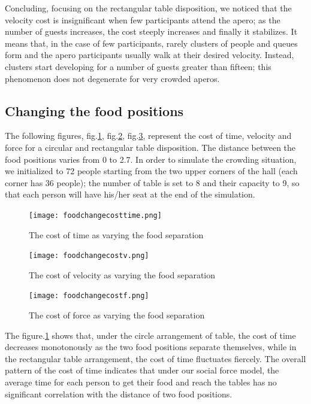 \documentclass[11pt]{article}
\begin{document}
Concluding, focusing on the rectangular table disposition, we noticed that the velocity cost is insignificant when few participants attend the apero; as the number of guests increases, the cost steeply increases and finally it stabilizes. It means that, in the case of few participants, rarely clusters of people and queues form and the apero participants usually walk at their desired velocity. Instead, clusters start developing for a number of guests greater than fifteen; this phenomenon does not degenerate for very crowded aperos.

\subsection{Changing the food positions}

The following figures, fig.\ref{fig:foodcostt}, fig.\ref{fig:foodcostv}, fig.\ref{fig:foodcostf}, represent the cost of time, velocity and force for a circular and rectangular table disposition. The distance between the food positions varies from 0 to 2.7. In order to simulate the crowding situation, we initialized to 72 people starting from the two upper corners of the hall (each corner has 36 people); the number of table is set to 8 and their capacity to 9, so that each person will have his/her seat at the end of the simulation.
\begin{figure}[ht!]
\centering
\texttt{[image: foodchangecosttime.png]}
\caption{The cost of time as varying the food separation}
\label{fig:foodcostt}
\end{figure}

\begin{figure}[ht!]
\centering
\texttt{[image: foodchangecostv.png]}
\caption{The cost of velocity as varying the food separation}
\label{fig:foodcostv}
\end{figure}

\begin{figure}[ht!]
\centering
\texttt{[image: foodchangecostf.png]}
\caption{The cost of force as varying the food separation}
\label{fig:foodcostf}
\end{figure}
The figure.\ref{fig:foodcostt} shows that, under the circle arrangement of table, the cost of time decreases monotonously as the two food positions separate themselves, while in the rectangular table arrangement, the cost of time fluctuates fiercely. The overall pattern of the cost of time indicates that under our social force model, the average time for each person to get their food and reach the tables has no significant correlation with the distance of two food positions.
\end{document}
